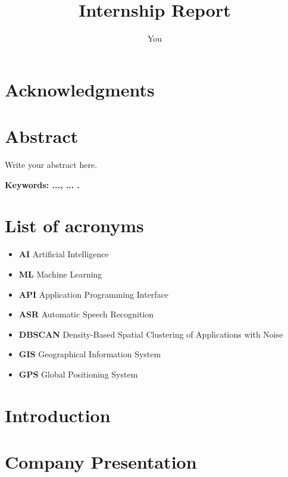 \documentclass[12pt,a4paper,oneside,english]{book}
\author{You}
\title{Internship Report}
\begin{document}

\chapter*{Acknowledgments}

\frontmatter %
\chapter*{Abstract}
\normalsize{Write your abstract here.

\medskip
{\noindent \textbf{Keywords: ..., ... .} }

\tableofcontents{}
\newpage 
\listoffigures
\newpage 
\listoftables
\newpage
{}
\chapter*{List of acronyms}
\begin{itemize}
\item \textbf{AI} Artificial Intelligence
\item \textbf{ML} Machine Learning
\item \textbf{API} Application Programming Interface
\item \textbf{ASR} Automatic Speech Recognition
\item \textbf{DBSCAN} Density-Based Spatial Clustering of Applications with Noise
\item \textbf{GIS} Geographical Information System
\item \textbf{GPS} Global Positioning System

\end{itemize}

\frontmatter %

\chapter*{Introduction}

\chapter{Company Presentation} %

}
\end{document}
